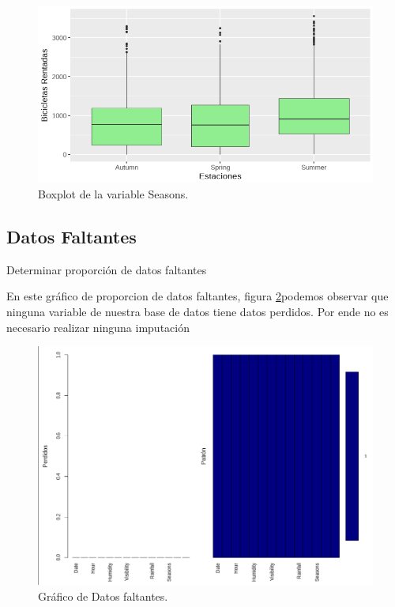 \documentclass[]{elsarticle} %
\begin{document}
\begin{figure}[H]

{\centering \includegraphics[width=1\linewidth]{boxplot_seasons} 

}

\caption{\label{fig:fig6}Boxplot de la variable Seasons. }\label{fig:fig6}
\end{figure}
\newpage
\subsection{Datos Faltantes}

Determinar proporción de datos faltantes

En este gráfico de proporcion de datos faltantes, figura
\ref{fig:fig7}podemos observar que ninguna variable de nuestra base de
datos tiene datos perdidos. Por ende no es necesario realizar ninguna
imputación

\begin{figure}[H]

{\centering \includegraphics[width=1\linewidth]{missing_data} 

}

\caption{\label{fig:fig7}Gráfico de Datos faltantes.}\label{fig:fig7}
\end{figure}
\newpage
\end{document}
